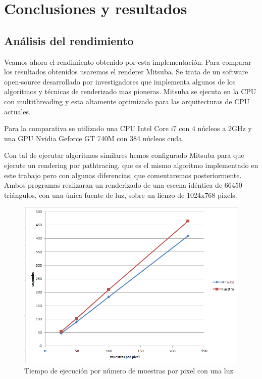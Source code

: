 \chapter{Conclusiones y resultados}

\section{Análisis del rendimiento}

Veamos ahora el rendimiento obtenido por esta implementación. Para comparar los resultados obtenidos usaremos el renderer Mitsuba. Se trata de un software open-source desarrollado por investigadores que implementa algunos de los algoritmos y técnicas de renderizado mas pioneras. Mitsuba se ejecuta en la CPU con multithreading y esta altamente optimizado para las arquitecturas de CPU actuales.

\medskip
Para la comparativa se utilizado una CPU Intel Core i7 con 4 núcleos a 2GHz y una GPU Nvidia Geforce GT 740M con 384 núcleos cuda.
\medskip

Con tal de ejecutar algoritmos similares hemos configurado Mitsuba para que ejecute un rendering por pathtracing, que es el mismo algoritmo implementado en este trabajo pero con algunas diferencias, que comentaremos posteriormente.
Ambos programas realizaran un renderizado de una escena idéntica de 66450 triángulos, con una única fuente de luz, sobre un lienzo de 1024x768 pixels.

\clearpage

\begin{figure}[h!]
\centering
\includegraphics[width=5in]{comparativa_1.png}
\caption{Tiempo de ejecución por número de muestras por pixel con una luz}
\end{figure}

